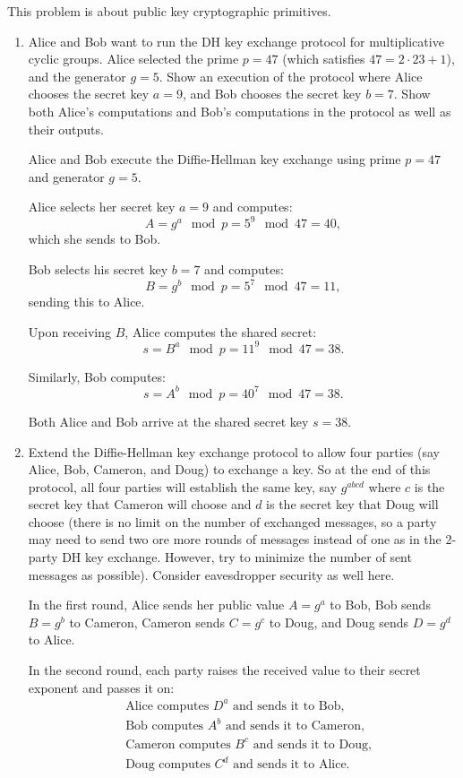 \documentclass[12pt]{article}
\begin{document}
This problem is about public key cryptographic primitives.
\begin{enumerate}

\item Alice and Bob want to run the DH key exchange protocol for multiplicative cyclic groups. Alice selected the prime $p=47$ (which satisfies $47=2\cdot 23+1$), and the generator $g=5$. Show an execution of the protocol where Alice chooses the secret key $a=9$, and Bob chooses the secret key $b=7$. Show both Alice's computations and Bob's computations in the protocol as well as their outputs. \newline

Alice and Bob execute the Diffie-Hellman key exchange using prime \( p = 47 \) and generator \( g = 5 \). 

Alice selects her secret key \( a = 9 \) and computes:
\[
A = g^a \mod p = 5^9 \mod 47 = 40,
\]
which she sends to Bob.

Bob selects his secret key \( b = 7 \) and computes:
\[
B = g^b \mod p = 5^7 \mod 47 = 11,
\]
sending this to Alice.

Upon receiving \( B \), Alice computes the shared secret:
\[
s = B^a \mod p = 11^9 \mod 47 = 38.
\]

Similarly, Bob computes:
\[
s = A^b \mod p = 40^7 \mod 47 = 38.
\]

Both Alice and Bob arrive at the shared secret key \( s = 38 \).


\item Extend the Diffie-Hellman key exchange protocol to allow four parties (say Alice, Bob, Cameron, and Doug) to exchange a key. So at the end of this protocol, all four parties will establish the same key, say $g^{abcd}$ where $c$ is the secret key that Cameron will choose and $d$ is the secret key that Doug will choose (there is no limit on the number of exchanged messages, so a party may need to send two ore more rounds of messages instead of one as in the 2-party DH key exchange. However, try to minimize the number of sent messages as possible). Consider eavesdropper security as well here. \newline

In the first round, Alice sends her public value \( A = g^a \) to Bob, Bob sends \( B = g^b \) to Cameron, Cameron sends \( C = g^c \) to Doug, and Doug sends \( D = g^d \) to Alice.

In the second round, each party raises the received value to their secret exponent and passes it on:
\[
\begin{aligned}
    &\text{Alice computes } D^a \text{ and sends it to Bob,} \\
    &\text{Bob computes } A^b \text{ and sends it to Cameron,} \\
    &\text{Cameron computes } B^c \text{ and sends it to Doug,} \\
    &\text{Doug computes } C^d \text{ and sends it to Alice.}
\end{aligned}
\]


\end{enumerate}
\end{document}
